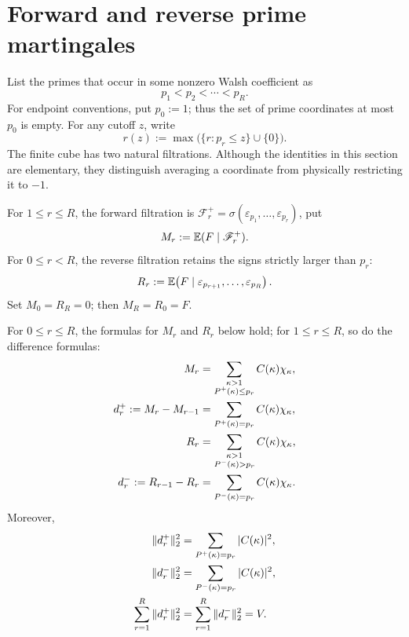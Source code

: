 \section{Forward and reverse prime martingales}
\label{sec:tpc44-prime-martingales}

List the primes that occur in some nonzero Walsh coefficient as
\begin{equation}
 p_1<p_2<\cdots<p_R.
 \label{eq:tpc44-active-primes}
\end{equation}
For endpoint conventions, put \(p_0:=1\); thus the set of prime
coordinates at most \(p_0\) is empty.
For any cutoff \(z\), write
\begin{equation}
 r(z):=\max\bigl(\{r:p_r\le z\}\cup\{0\}\bigr).
 \label{eq:tpc44-cutoff-index}
\end{equation}
The finite cube has two natural filtrations.  Although the identities in
this section are elementary, they distinguish averaging a coordinate
from physically restricting it to \(-1\).

For \(1\le r\le R\), the forward filtration is
\(
 \mathscr F_r^+=\sigma(\varepsilon_{p_1},\ldots,\varepsilon_{p_r})
\), put
\begin{equation}
 M_r:=\mathbb E(F\mid\mathscr F_r^+).
 \label{eq:tpc44-forward-martingale}
\end{equation}
For \(0\le r<R\), the reverse filtration retains the signs strictly
larger than \(p_r\):
\begin{equation}
 R_r:=\mathbb E\!\left(
 F\mid\varepsilon_{p_{r+1}},\ldots,\varepsilon_{p_R}
 \right).
 \label{eq:tpc44-reverse-martingale}
\end{equation}
Set \(M_0=R_R=0\); then \(M_R=R_0=F\).

\begin{proposition}
\label{prop:tpc44-prime-layers}
For \(0\le r\le R\), the formulas for \(M_r\) and \(R_r\) below hold;
for \(1\le r\le R\), so do the difference formulas:
\begin{align}
 M_r
 &=\sum_{\substack{\kappa>1\\P^{+}(\kappa)\le p_r}}
 C(\kappa)\chi_\kappa,
 \label{eq:tpc44-forward-spectrum}\\
 d_r^+:=M_r-M_{r-1}
 &=\sum_{P^{+}(\kappa)=p_r}C(\kappa)\chi_\kappa,
 \label{eq:tpc44-forward-difference}\\
 R_r
 &=\sum_{\substack{\kappa>1\\P^{-}(\kappa)>p_r}}
 C(\kappa)\chi_\kappa,
 \label{eq:tpc44-reverse-spectrum}\\
 d_r^-:=R_{r-1}-R_r
 &=\sum_{P^{-}(\kappa)=p_r}C(\kappa)\chi_\kappa.
 \label{eq:tpc44-reverse-difference}
\end{align}
Moreover,
\begin{align}
 \|d_r^+\|_2^2
 &=\sum_{P^{+}(\kappa)=p_r}|C(\kappa)|^2,
 \label{eq:tpc44-forward-layer-energy}\\
 \|d_r^-\|_2^2
 &=\sum_{P^{-}(\kappa)=p_r}|C(\kappa)|^2,
 \label{eq:tpc44-reverse-layer-energy}\\
 \sum_{r=1}^{R}\|d_r^+\|_2^2
 &=\sum_{r=1}^{R}\|d_r^-\|_2^2=V.
 \label{eq:tpc44-martingale-parseval}
\end{align}
\end{proposition}

